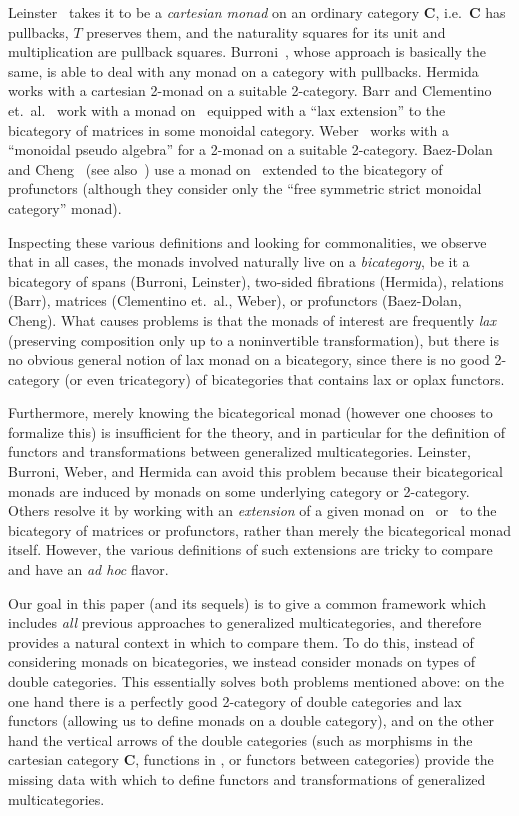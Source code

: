 \documentclass{tac}
\numberwithin{equation}{section}
\begin{document}
Leinster~\cite{GeneralizedEnrichmentofCategories,leinster:higher-opds}
takes it to be a \emph{cartesian monad} on an ordinary category
$\mathbf{C}$, i.e.\ $\mathbf{C}$ has pullbacks, $T$ preserves them,
and the naturality squares for its unit and multiplication are
pullback squares.  Burroni~\cite{burroni:t-cats}, whose approach is
basically the same, is able to deal with any monad on a category with pullbacks.
Hermida~\cite{HermidaCoherent} works with a cartesian 2-monad on a
suitable 2-category.  Barr and Clementino
et.~al.~\cite{RelationalAlgebras,CommonApproach,OneSetting} work with a monad on
\Set\ equipped with a ``lax extension'' to the bicategory of matrices
in some monoidal category.  Weber~\cite{weber:operads} works with a
``monoidal pseudo algebra'' for a 2-monad on a suitable 2-category.
Baez-Dolan~\cite{bd:hda3} and Cheng~\cite{cheng:opetopic} (see
also~\cite{fghw:gen-species}) use a monad on \Cat\ extended to the
bicategory of profunctors (although they consider only the ``free
symmetric strict monoidal category'' monad).

Inspecting these various definitions and looking for commonalities, we
observe that in all cases,
the monads involved naturally live on a \emph{bicategory}, be it a
bicategory of spans (Burroni, Leinster), two-sided fibrations
(Hermida), relations (Barr), matrices (Clementino et.~al., Weber), or profunctors
(Baez-Dolan, Cheng).  What causes problems is that the monads of interest are frequently
\emph{lax} (preserving composition only up to a noninvertible
transformation), but there is no obvious general notion of
lax monad on a bicategory, since there is no good 2-category
(or even tricategory) of bicategories that contains lax or oplax
functors.


Furthermore, merely knowing the bicategorical monad (however one
chooses to formalize this) is insufficient for the theory, and in
particular for the definition of functors and transformations between
generalized multicategories.  Leinster, Burroni, Weber, and Hermida
can avoid this problem because their bicategorical monads are induced
by monads on some underlying category or 2-category.  Others resolve
it by working with an \emph{extension} of a given monad on \Set\ or
\Cat\ to the bicategory of matrices or profunctors, rather than merely
the bicategorical monad itself.  However, the various definitions of
such extensions are tricky to compare and have an \emph{ad hoc}
flavor.

Our goal in this paper (and its sequels) is to give a common framework
which includes \emph{all} previous approaches to generalized
multicategories, and therefore provides a natural context in which to
compare them.  To do this, instead of considering monads on
bicategories, we instead consider monads on types of double categories.
This essentially solves both problems mentioned above: on the one hand
there is a perfectly good 2-category of double categories and lax
functors (allowing us to define monads on a double category), and on the
other hand the vertical arrows of the double categories (such as
morphisms in the cartesian category $\mathbf{C}$, functions in \Set, or
functors between categories) provide the missing data with which to
define functors and transformations of generalized multicategories.
\end{document}

